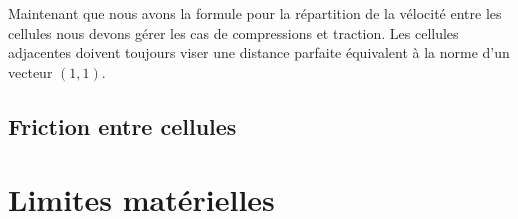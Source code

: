 \documentclass[a4paper,10pt]{article}
\begin{document}
Maintenant que nous avons la formule pour la répartition de la vélocité entre les cellules nous devons gérer les cas de compressions et traction. Les cellules adjacentes doivent toujours viser une distance parfaite équivalent à la norme d'un vecteur $(1, 1)$.

\subsection{Friction entre cellules}

\section{Limites matérielles}
\end{document}
